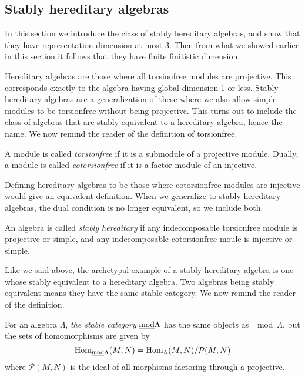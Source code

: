 \subsection{Stably hereditary algebras}\label{sec:stable_hereditary_algebras}

In this section we introduce the class of stably hereditary algebras, and show that they have representation dimension at most 3. Then from what we showed earlier in this section it follows that they have finite finitistic dimension.

Hereditary algebras are those where all torsionfree modules are projective. This corresponds exactly to the algebra having global dimension 1 or less. Stably hereditary algebras are a generalization of these where we also allow simple modules to be torsionfree without being projective. This turns out to include the class of algebras that are stably equivalent to a hereditary algebra, hence the name. We now remind the reader of the definition of torsionfree. 

\begin{defn}[(co)torsionfree]
	A module is called \emph{torsionfree} if it is a submodule of a projective module. Dually, a module is called \emph{cotorsionfree} if it is a factor module of an injective.
\end{defn}

Defining hereditary algebras to be those where cotorsionfree modules are injective would give an equivalent definition. When we generalize to stably hereditary algebras, the dual condition is no longer equivalent, so we include both.

\begin{defn}
	An algebra is called \emph{stably hereditary} if any indecomposable torsionfree module is projective or simple, and any indecomposable cotorsionfree moule is injective or simple. 
\end{defn}

Like we said above, the archetypal example of a stably hereditary algebra is one whose stably equivalent to a hereditary algebra. Two algebras being stably equivalent means they have the same stable category. We now remind the reader of the definition.

\begin{defn}
	For an algebra $\Lambda$, \emph{the stable category} $\underline{\mod}\Lambda$ has the same objects as $\mod\Lambda$, but the sets of homomorphisms are given by $$\Hom_{\underline{\mod}\Lambda}(M, N) = \Hom_\Lambda(M,N)/\mathcal{P}(M,N)$$
	where $\mathcal{P}(M,N)$ is the ideal of all morphisms factoring through a projective.
\end{defn}

